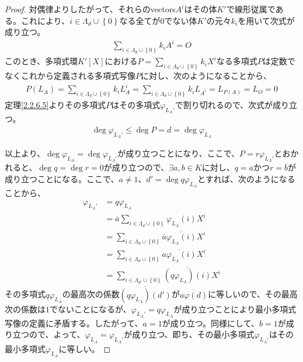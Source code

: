 \documentclass[dvipdfmx]{jsarticle}
\begin{document}
\begin{proof}
対偶律よりしたがって、それらのvectors$A^{i}$はその体$K'$で線形従属である。これにより、$i \in \varLambda_{d} \cup \left\{ 0 \right\}$なる全てが$0$でない体$K'$の元々$k_{i}$を用いて次式が成り立つ。
\begin{align*}
\sum_{i \in \varLambda_{d} \cup \left\{ 0 \right\}} {k_{i}A^{i}} = O
\end{align*}
このとき、多項式環$K'[ X]$における$P = \sum_{i \in \varLambda_{d} \cup \left\{ 0 \right\}} {k_{i}X^{i}}$なる多項式$P$は定数でなくこれから定義される多項式写像$P$に対し、次のようになることから、
\begin{align*}
P\left( L_{A} \right) = \sum_{i \in \varLambda_{d} \cup \left\{ 0 \right\}} {k_{i}L_{A}^{i}} = \sum_{i \in \varLambda_{d} \cup \left\{ 0 \right\}} {k_{i}L_{A^{i}}} = L_{P(A)} = L_{O} = 0
\end{align*}
定理\ref{2.2.6.5}よりその多項式$P$はその多項式$\varphi_{L_{A}'}$で割り切れるので、次式が成り立つ。
\begin{align*}
\deg{\varphi_{L_{A}'}} \leq \deg{P} = d = \deg{\varphi_{L_{A}}}
\end{align*}\par
以上より、$\deg{\varphi_{L_{A}}} = \deg{\varphi_{L_{A}'}}$が成り立つことになり、ここで、$P = r\varphi_{L_{A}'}$とおかれると、$\deg{q} = \deg{r} = 0$が成り立つので、$\exists a,b \in K$に対し、$q = \overline{a}$かつ$r = \overline{b}$が成り立つことになる。ここで、$a \neq 1$、$d' = \deg{q\varphi_{L_{A}}}$とすれば、次のようになることから、
\begin{align*}
\varphi_{L_{A}'} &= q\varphi_{L_{A}}\\
&= \overline{a}\sum_{i \in \varLambda_{d} \cup \left\{ 0 \right\}} {\varphi_{L_{A}}(i)X^{i}}\\
&= \sum_{i \in \varLambda_{d} \cup \left\{ 0 \right\}} {\overline{a}\overline{\varphi_{L_{A}}(i)}X^{i}}\\
&= \sum_{i \in \varLambda_{d} \cup \left\{ 0 \right\}} {\overline{a\varphi_{L_{A}}(i)}X^{i}}\\
&= \sum_{i \in \varLambda_{d'} \cup \left\{ 0 \right\}} {\overline{\left( q\varphi_{L_{A}} \right)(i)}X^{i}}
\end{align*}
その多項式$q\varphi_{L_{A}}$の最高次の係数$\overline{\left( q\varphi_{L_{A}} \right)\left( d' \right)}$が$\overline{a\varphi(d)}$に等しいので、その最高次の係数は$\overline{1}$でないことになるが、$\varphi_{L_{A}'} = q\varphi_{L_{A}}$が成り立つことにより最小多項式写像の定義に矛盾する。したがって、$a = 1$が成り立つ。同様にして、$b = 1$が成り立つので、よって、$\varphi_{L_{A}} = \varphi_{L_{A}'}$が成り立つ、即ち、その最小多項式$\varphi_{L_{A}'}$はその最小多項式$\varphi_{L_{A}}$に等しい。
\end{proof}
\end{document}
